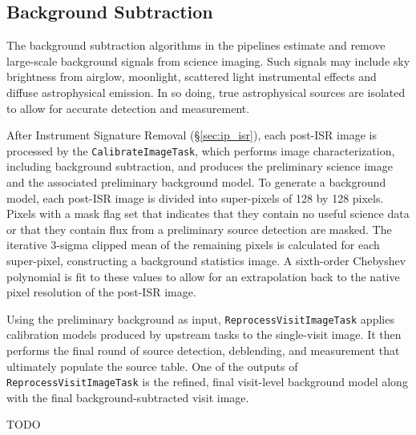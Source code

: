 \subsection{Background Subtraction}
\label{sec:backgrounds}


The background subtraction algorithms in the pipelines estimate and remove large-scale background signals from science imaging.
Such signals may include sky brightness from airglow, moonlight, scattered light instrumental effects and diffuse astrophysical emission.
In so doing, true astrophysical sources are isolated to allow for accurate detection and measurement.

After Instrument Signature Removal (\S\ref{sec:ip_isr}), each post-ISR image is processed by the \texttt{Calibrate\-Image\-Task}, which performs image characterization, including background subtraction, and produces the preliminary science image and the associated preliminary background model.
To generate a background model, each post-ISR image is divided into super-pixels of 128 by 128 pixels.
Pixels with a mask flag set that indicates that they contain no useful science data or that they contain flux from a preliminary source detection are masked.
The iterative 3-sigma clipped mean of the remaining pixels is calculated for each super-pixel, constructing a background statistics image.
A sixth-order Chebyshev polynomial is fit to these values to allow for an extrapolation back to the native pixel resolution of the post-ISR image.

Using the preliminary background as input, \texttt{Reprocess\-Visit\-Image\-Task} applies calibration models produced by upstream tasks to the single-visit image.
It then performs the final round of source detection, deblending, and measurement that ultimately populate the source table.
One of the outputs of \texttt{Reprocess\-Visit\-Image\-Task} is the refined, final visit-level background model along with the final background-subtracted visit image.

TODO
